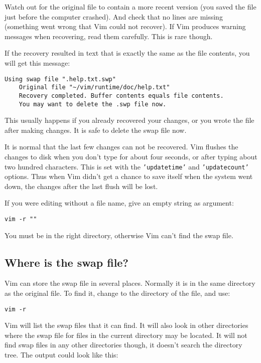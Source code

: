 Watch out for the original file to contain a more recent version (you saved the file just before the computer crashed).
And check that no lines are missing (something went wrong that Vim could not recover).
If Vim produces warning messages when recovering, read them carefully.
This is rare though.

If the recovery resulted in text that is exactly the same as the file contents, you will get this message:

\begin{Verbatim}[samepage=true]
    Using swap file ".help.txt.swp" 
    Original file "~/vim/runtime/doc/help.txt" 
    Recovery completed. Buffer contents equals file contents. 
    You may want to delete the .swp file now. 
\end{Verbatim}

This usually happens if you already recovered your changes, or you wrote the file after making changes.
It is safe to delete the swap file now.

It is normal that the last few changes can not be recovered.
Vim flushes the changes to disk when you don't type for about four seconds, or after typing about two hundred characters.
This is set with the \texttt{'updatetime'} and \texttt{'updatecount'} options.
Thus when Vim didn't get a chance to save itself when the system went down, the changes after the last flush will be lost.

If you were editing without a file name, give an empty string as argument:

\begin{Verbatim}[samepage=true]
 vim -r ""
\end{Verbatim}

You must be in the right directory, otherwise Vim can't find the swap file.
\subsection{Where is the swap file?}
Vim can store the swap file in several places.
Normally it is in the same directory as the original file.
To find it, change to the directory of the file, and use:

\begin{Verbatim}[samepage=true]
 vim -r
\end{Verbatim}

Vim will list the swap files that it can find.
It will also look in other directories where the swap file for files in the current directory may be located.
It will not find swap files in any other directories though, it doesn't search the directory tree.
The output could look like this:

